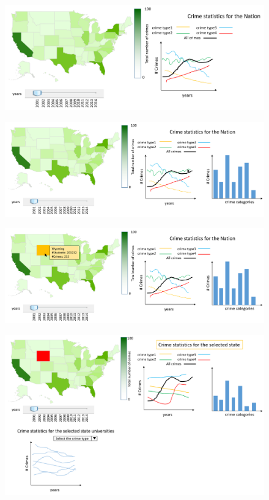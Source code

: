 \documentclass[12pt]{article}
\begin{document}
\begin{figure}[tbph]
   \centering{}
	       \includegraphics[width=6in]{prot1-overall}           
\caption{}
\label{fig:p1-overall}
\end{figure}

\begin{figure}[tbph]
   \centering{}
	       \includegraphics[width=6in]{prot1-1}           
\caption{}
\label{fig:p1-1}
\end{figure}

\begin{figure}[tbph]
   \centering{}
	       \includegraphics[width=6in]{prot1-2}           
\caption{}
\label{fig:p1-2}
\end{figure}

\begin{figure}[tbph]
   \centering{}
	       \includegraphics[width=6in]{prot1-3}           
\caption{}
\label{fig:p1-3}
\end{figure}
\end{document}
